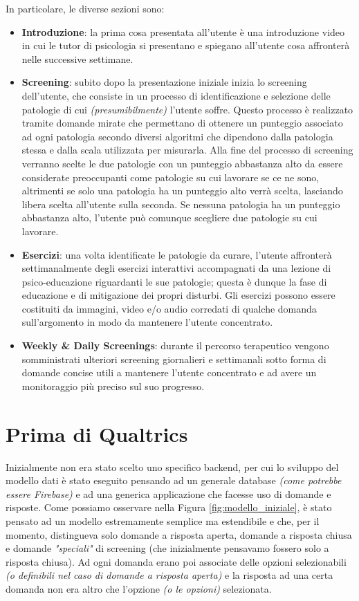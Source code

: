 \newpage

In particolare, le diverse sezioni sono:

\renewcommand{\labelitemi}{$\textendash$}
\begin{itemize}
\item \textbf{Introduzione}: la prima cosa presentata all'utente è una introduzione video in cui le tutor di psicologia si presentano e spiegano all'utente cosa affronterà nelle successive settimane.
\item \textbf{Screening}: subito dopo la presentazione iniziale inizia lo screening dell'utente, che consiste in un processo di identificazione e selezione delle patologie di cui \textit{(presumibilmente)} l'utente soffre. Questo processo è realizzato tramite domande mirate che permettano di ottenere un punteggio associato ad ogni patologia secondo diversi algoritmi che dipendono dalla patologia stessa e dalla scala utilizzata per misurarla. Alla fine del processo di screening verranno scelte le due patologie con un punteggio abbastanza alto da essere considerate preoccupanti come patologie su cui lavorare se ce ne sono, altrimenti se solo una patologia ha un punteggio alto verrà scelta, lasciando libera scelta all'utente sulla seconda. Se nessuna patologia ha un punteggio abbastanza alto, l'utente può comunque scegliere due patologie su cui lavorare.
\item \textbf{Esercizi}: una volta identificate le patologie da curare, l'utente affronterà settimanalmente degli esercizi interattivi accompagnati da una lezione di psico-educazione riguardanti le sue patologie; questa è dunque la fase di educazione e di mitigazione dei propri disturbi. Gli esercizi possono essere costituiti da immagini, video e/o audio corredati di qualche domanda sull'argomento in modo da mantenere l'utente concentrato.
\item \textbf{Weekly \& Daily Screenings}: durante il percorso terapeutico vengono somministrati ulteriori screening giornalieri e settimanali sotto forma di domande concise utili a mantenere l'utente concentrato e ad avere un monitoraggio più preciso sul suo progresso.
\end{itemize}

\newpage

\section{Prima di Qualtrics}
Inizialmente non era stato scelto uno specifico backend, per cui lo sviluppo del modello dati è stato eseguito pensando ad un generale database \textit{(come potrebbe essere Firebase)} e ad una generica applicazione che facesse uso di domande e risposte. Come possiamo osservare nella Figura \ref{fig:modello_iniziale}, è stato pensato ad un modello estremamente semplice ma estendibile e che, per il momento, distingueva solo domande a risposta aperta, domande a risposta chiusa e domande \textit{"speciali"} di screening (che inizialmente pensavamo fossero solo a risposta chiusa).
Ad ogni domanda erano poi associate delle opzioni selezionabili \textit{(o definibili nel caso di domande a risposta aperta)} e la risposta ad una certa domanda non era altro che l'opzione \textit{(o le opzioni)} selezionata.

